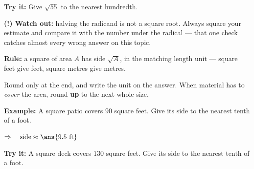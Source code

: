 \documentclass[12pt]{article}
\begin{document}
\begin{tryitbox}
\textbf{Try it:} \quad Give $\sqrt{55}$ to the nearest hundredth.\\[2pt]
\end{tryitbox}

\begin{watchoutbox}
\textbf{(!) Watch out:} halving the radicand is not a square root. Always square your
estimate and compare it with the number under the radical --- that one check catches
almost every wrong answer on this topic.
\end{watchoutbox}


\begin{formulabox}
\textbf{Rule:} a square of area $A$ has side $\sqrt{A}$, in the matching length unit ---
square feet give feet, square metres give metres.
\par\smallskip
Round only at the end, and write the unit on the answer. When material has to
\emph{cover} the area, round \textbf{up} to the next whole size.
\end{formulabox}

\begin{examplebox}
\textbf{Example:} \quad A square patio covers $90$ square feet. Give its side to the
nearest tenth of a foot.

$\Rightarrow\quad \text{side} \approx \ans{9.5 \text{ ft}}$
\end{examplebox}

\begin{tryitbox}
\textbf{Try it:} \quad A square deck covers $130$ square feet. Give its side to the
nearest tenth of a foot.\\[2pt]
\end{tryitbox}
\end{document}
